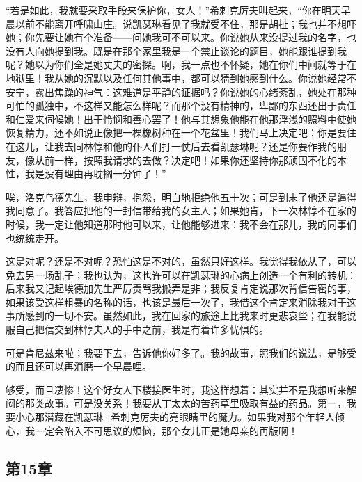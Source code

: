 \par “若是如此，我就要采取手段来保护你，女人！”希刺克厉夫叫起来，“你在明天早晨以前不能离开呼啸山庄。说凯瑟琳看见了我就受不住，那是胡扯；我也并不想吓她；你先要让她有个准备——问她我可不可以来。你说她从来没提过我的名字，也没有人向她提到我。既是在那个家里我是一个禁止谈论的题目，她能跟谁提到我呢？她以为你们全是她丈夫的密探。啊，我一点也不怀疑，她在你们中间就等于在地狱里！我从她的沉默以及任何其他事中，都可以猜到她感到什么。你说她经常不安宁，露出焦躁的神气：这难道是平静的证据吗？你说她的心绪紊乱，她处在那种可怕的孤独中，不这样又能怎么样呢？而那个没有精神的，卑鄙的东西还出于责任和仁爱来伺候她！出于怜悯和善心罢了！他与其想象他能在他那浮浅的照料中使她恢复精力，还不如说正像把一棵橡树种在一个花盆里！我们马上决定吧：你是要住在这儿，让我去同林惇和他的仆人们打一仗后去看凯瑟琳呢？还是你要作我的朋友，像从前一样，按照我请求的去做？决定吧！如果你还坚持你那顽固不化的本性，我是没有理由再耽搁一分钟了！”
\par 唉，洛克乌德先生，我申辩，抱怨，明白地拒绝他五十次；可是到末了他还是逼得我同意了。我答应把他的一封信带给我的女主人；如果她肯，下一次林惇不在家的时候，我一定让他知道那时他可以来，让他能够进来：我不会在那儿，我的同事们也统统走开。
\par 这是对呢？还是不对呢？恐怕这是不对的，虽然只好这样。我觉得我依从了，可以免去另一场乱子；我也认为，这也许可以在凯瑟琳的心病上创造一个有利的转机：后来我又记起埃德加先生严厉责骂我搬弄是非；我反复肯定说那次背信告密的事，如果该受这样粗暴的名称的话，也该是最后一次了，我借这个肯定来消除我对于这事所感到的一切不安。虽然如此，我在回家的旅途上比我来时更悲哀些；在我能说服自己把信交到林惇夫人的手中之前，我是有着许多忧惧的。
\par 可是肯尼兹来啦；我要下去，告诉他你好多了。我的故事，照我们的说法，是够受的而且还可以再消磨一个早晨哩。
\par 够受，而且凄惨！这个好女人下楼接医生时，我这样想着：其实并不是我想听来解闷的那类故事。可是没关系！我要从丁太太的苦药草里吸取有益的药品。第一，我要小心那潜藏在凯瑟琳·希刺克厉夫的亮眼睛里的魔力。如果我对那个年轻人倾心，我一定会陷入不可思议的烦恼，那个女儿正是她母亲的再版啊！


\subsection{第15章}

